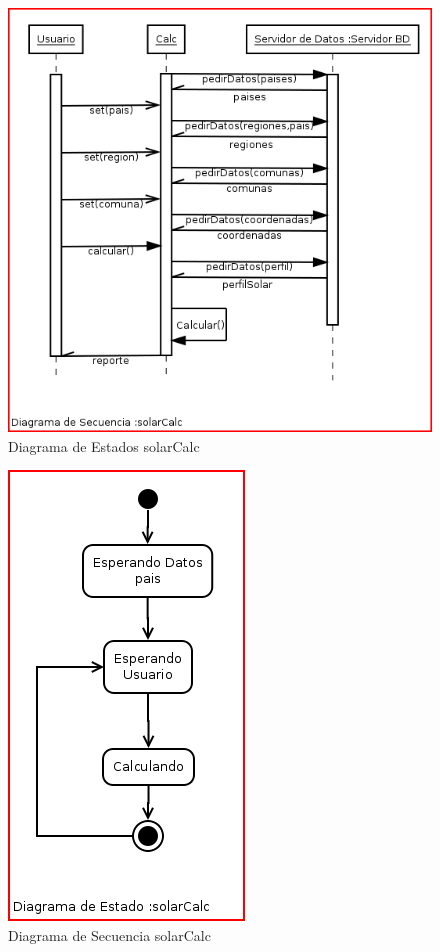 \begin{figure}[h!]
        \centering
        \includegraphics[scale=0.4]{images/calcSecuencia}
        \caption{Diagrama de Estados solarCalc}
        \label{solarCalcS}
\end{figure}
\begin{figure}[h!]
        \centering
        \includegraphics[scale=0.4]{images/calcEstado}
        \caption{Diagrama de Secuencia solarCalc}
        \label{solarCalcE}
\end{figure}

